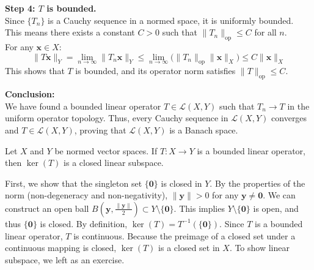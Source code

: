 \begin{pfbox}
\textbf{Step 4: $T$ is bounded.} \\
Since $\{T_n\}$ is a Cauchy sequence in a normed space, it is uniformly bounded. This means there exists a constant $C > 0$ such that $\|T_n\|_{\mathrm{op}} \le C$ for all $n$. \\
For any $\mathbf{x} \in X$:
\[ \|T\mathbf{x}\|_Y = \lim_{n \to \infty} \|T_n \mathbf{x}\|_Y \le \lim_{n \to \infty} \big( \|T_n\|_{\mathrm{op}} \|\mathbf{x}\|_X \big) \le C \|\mathbf{x}\|_X \]
This shows that $T$ is bounded, and its operator norm satisfies $\|T\|_{\mathrm{op}} \le C$.

\textbf{Conclusion:} \\
We have found a bounded linear operator $T \in \mathcal{L}(X,Y)$ such that $T_n \to T$ in the uniform operator topology. Thus, every Cauchy sequence in $\mathcal{L}(X,Y)$ converges and $T\in\mathcal{L}(X,Y)$, proving that $\mathcal{L}(X,Y)$ is a Banach space.
\end{pfbox}


\begin{proposition}
Let $X$ and $Y$ be normed vector spaces.
If $T: X \to Y$ is a bounded linear operator, then $\ker(T)$ is a closed linear subspace.
\end{proposition}

\begin{pfbox}
    First, we show that the singleton set $\{\mathbf{0}\}$ is closed in $Y$. By the properties of the norm (non-degeneracy and non-negativity), $\|\mathbf{y}\| > 0$ for any $\mathbf{y} \ne \mathbf{0}$. We can construct an open ball $B\left(\mathbf{y}, \frac{\|\mathbf{y}\|}{2}\right) \subset Y \setminus \{\mathbf{0}\}$. This implies $Y \setminus \{\mathbf{0}\}$ is open, and thus $\{\mathbf{0}\}$ is closed.
    By definition, $\ker(T) = T^{-1}(\{\mathbf{0}\})$. Since $T$ is a bounded linear operator, $T$ is continuous. Because the preimage of a closed set under a continuous mapping is closed, $\ker(T)$ is a closed set in $X$.
    To show linear subspace, we left as an exercise.
\end{pfbox}

